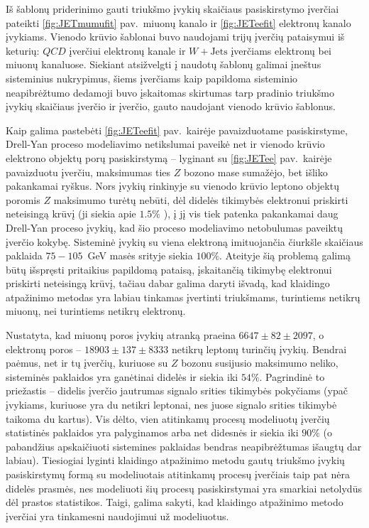 \documentclass[a4paper, 12pt, oneside]{article}
\newcommand{\WJets}{W\! +\!\mathrm{Jets}}
\newcommand{\QCD}{QC\! D}
\begin{document}
Iš šablonų priderinimo gauti triukšmo įvykių skaičiaus pasiskirstymo įverčiai pateikti \ref{fig:JETmumufit} pav.\ miuonų kanalo
ir \ref{fig:JETeefit} elektronų kanalo įvykiams.
Vienodo krūvio šablonai buvo naudojami trijų įverčių pataisymui iš keturių: $\QCD$ įverčiui elektronų kanale ir $\WJets$ įverčiams
elektronų bei miuonų kanaluose.
Siekiant atsižvelgti į naudotų šablonų galimai įneštus sisteminius nukrypimus, šiems įverčiams kaip papildoma sisteminio neapibrėžtumo
dedamoji buvo įskaitomas skirtumas tarp pradinio triukšmo įvykių skaičiaus įverčio ir įverčio, gauto naudojant vienodo krūvio
šablonus.

Kaip galima pastebėti \ref{fig:JETeefit} pav.\ kairėje pavaizduotame pasiskirstyme, Drell-Yan proceso modeliavimo
netikslumai paveikė net ir vienodo krūvio elektrono objektų porų pasiskirstymą -- lyginant su \ref{fig:JETee} pav.\ kairėje
pavaizduotu įverčiu, maksimumas ties $Z$ bozono mase sumažėjo, bet išliko pakankamai ryškus.
Nors įvykių rinkinyje su vienodo krūvio leptono objektų poromis $Z$ maksimumo turėtų nebūti, dėl didelės tikimybės elektronui
priskirti neteisingą krūvį (ji siekia apie $1.5\%$ \cite{EleID}), į jį vis tiek patenka pakankamai daug Drell-Yan proceso įvykių,
kad šio proceso modeliavimo netobulumas paveiktų įverčio kokybę.
Sisteminė įvykių su viena elektroną imituojančia čiurkšle skaičiaus paklaida $75-105$~GeV masės srityje siekia $100\%$.
Ateityje šią problemą galimą būtų išspręsti pritaikius papildomą pataisą, įskaitančią tikimybę elektronui priskirti neteisingą krūvį,
tačiau dabar galima daryti išvadą, kad klaidingo atpažinimo metodas yra labiau tinkamas įvertinti triukšmams, turintiems netikrų
miuonų, nei turintiems netikrų elektronų.

Nustatyta, kad miuonų poros įvykių atranką praeina $6647\pm 82 \pm 2097$, o elektronų poros -- $18903\pm 137\pm 8333$
netikrų leptonų turinčių įvykių.
Bendrai paėmus, net ir tų įverčių, kuriuose su $Z$ bozonu susijusio maksimumo neliko, sisteminės paklaidos yra ganėtinai didelės
ir siekia iki $54\%$.
Pagrindinė to priežastis -- didelis įverčio jautrumas signalo srities tikimybės pokyčiams (ypač įvykiams, kuriuose yra
du netikri leptonai, nes juose signalo srities tikimybė taikoma du kartus).
Vis dėlto, vien atitinkamų procesų modeliuotų įverčių statistinės paklaidos yra palyginamos arba net didesnės ir
siekia iki $90\%$ (o pabandžius apskaičiuoti sistemines paklaidas bendras neapibrėžtumas išaugtų dar labiau).
Tiesiogiai lyginti klaidingo atpažinimo metodu gautų triukšmo įvykių pasiskirstymų formą su modeliuotais atitinkamų procesų įverčiais
taip pat nėra didelės prasmės, nes modeliuoti šių procesų pasiskirstymai yra smarkiai netolydūs dėl prastos statistikos.
Taigi, galima sakyti, kad klaidingo atpažinimo metodo įverčiai yra tinkamesni naudojimui už modeliuotus.
\end{document}
